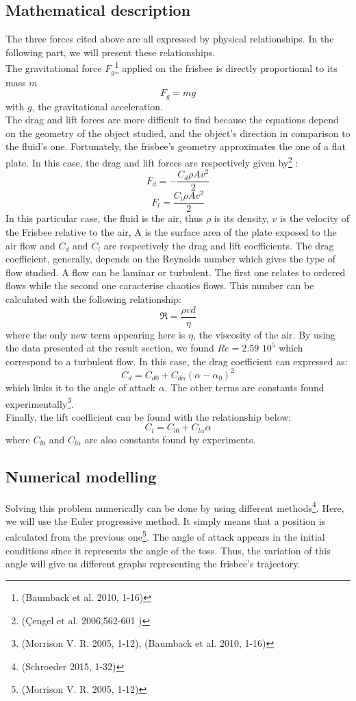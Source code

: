 \documentclass[10pt,a4paper]{report}
\begin{document}
\subsection{Mathematical description}
The three forces cited above are all expressed by physical relationships. In the following part, we will present these relationships.
\\The gravitational force $F_g$\footnote{(Baumback et al. 2010, 1-16)} applied on the frisbee is directly proportional to its mass $m$
\[F_g = m g\]
with $g$, the gravitational acceleration.
\\
The drag and lift forces are more difficult to find because the equations depend on the geometry of the object studied, and the object's direction in comparison to the fluid's one. Fortunately, the frisbee's geometry approximates the one of a flat plate. In this case, the drag and lift forces are respectively given by\footnote{(\c{C}engel et al. 2006,562-601 )} :
\[F_d = -\frac{C_d \rho A  v^2}{2}\]
\[F_l = \frac{C_l \rho A  v^2}{2}\]
In this particular case, the fluid is the air, thus $\rho$ is its density, $v$ is the velocity of the Frisbee relative to the air, A is the surface area of the plate exposed to the air flow and $C_d$ and $C_l$ are respectively the drag and lift coefficients.
The drag coefficient, generally, depends on the Reynolds number which gives the type of flow studied. A flow can be laminar or turbulent. The first one relates to ordered flows while the second one caracterise chaotics flows. This number can be calculated with the following relationship:
\[\Re = \frac{\rho v d}{\eta}\]
where the only new term appearing here is $\eta$, the viscosity of the air.
By using the data presented at the result section, we found $Re=2.59$ $10^5$ which correspond to a turbulent flow.
In this case, the drag coefficient can expressed as:
\[C_d = C_{d0} + C_{d\alpha}(\alpha-\alpha_0)^2\]
which links it to the angle of attack $\alpha$. The other terms are constants found experimentally\footnote{(Morrison V. R. 2005, 1-12), (Baumback et al. 2010, 1-16)}.
\\Finally, the lift coefficient can be found with the relationship below:
\[C_l = C_{l0} + C_{l \alpha} \alpha\]
where $C_{l0}$ and $C_{l\alpha}$ are also constants found by experiments.
\subsection{Numerical modelling}
Solving this problem numerically can be done by using different methods\footnote{(Schroeder 2015, 1-32)}. Here, we will use the Euler progressive method. It simply means that a position is calculated from the previous one\footnote{(Morrison V. R. 2005, 1-12)}.
The angle of attack appears in the initial conditions since it represents the angle of the toss. Thus, the variation of this angle will give us different graphs representing the frisbee's trajectory.
\end{document}
